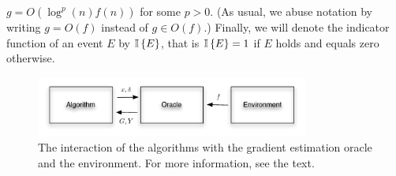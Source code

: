 $g =O( \log^p(n) f(n) )$ for some $p>0$.
(As usual, we abuse notation by writing $g= O(f)$ instead of $g\in O(f)$.)
Finally, we will denote the indicator function of an event $E$ by $\mathbb{I}\left\{E\right\}$, that is $\mathbb{I}\left\{E\right\}=1$ if $E$ holds and equals zero otherwise.
\begin{figure}
\begin{center}
\includegraphics[width=0.8\textwidth]{../figs/oracle}
\end{center}
\caption{The interaction of the algorithms with the gradient estimation oracle and the environment. For more information, see the text. \vspace{-0.3cm}}
\label{fig:oracle}
\end{figure}


